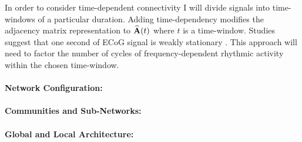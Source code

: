 In order to consider time-dependent connectivity I will divide signals into time-windows of a particular duration. Adding time-dependency modifies the adjacency matrix representation to $\widehat{\mathbf{\displaystyle A}}(t)$ where $t$ is a time-window. Studies suggest that one second of ECoG signal is weakly stationary \cite{kramer2010coalescence}. This approach will need to factor the number of cycles of frequency-dependent rhythmic activity within the chosen time-window.
~\\
~\\
\textbf{Network Configuration:}
~\\
~\\
\textbf{Communities and Sub-Networks:}
~\\
~\\
\textbf{Global and Local Architecture:}


